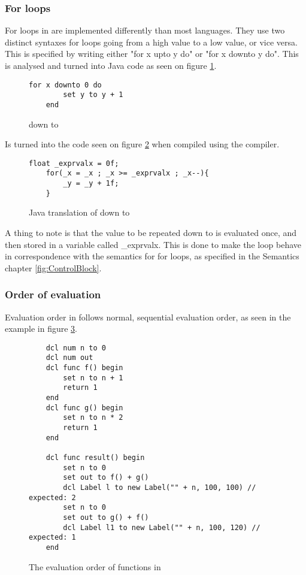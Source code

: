\subsubsection{For loops}
For loops in \lang{} are implemented differently than most languages. They use two distinct syntaxes for loops going from a high value to a low value, or vice versa. This is specified by writing either "for x upto y do" or "for x downto y do". This is analysed and turned into Java code as seen on figure \ref{fig:downtobfgl}.

\begin{figure}[H]
\centering
    \begin{lstlisting}[style=gglang]
    for x downto 0 do
        set y to y + 1
    end
    \end{lstlisting}
    \caption{\lang{} down to}\label{fig:downtobfgl}
\end{figure}
Is turned into the code seen on figure \ref{fig:downtojava} when compiled using the \lang{} compiler.
\begin{figure}[H]
\centering
    \begin{lstlisting}[style=gglang]
    float _exprvalx = 0f;
    for(_x = _x ; _x >= _exprvalx ; _x--){
        _y = _y + 1f;
    }
    \end{lstlisting}
    \caption{Java translation of down to}\label{fig:downtojava}
\end{figure}

A thing to note is that the value to be repeated down to is evaluated once, and then stored in a variable called \_exprvalx. This is done to make the loop behave in correspondence with the semantics for for loops, as specified in the Semantics chapter \ref{fig:ControlBlock}.

\subsubsection*{Order of evaluation}
Evaluation order in \lang{} follows normal, sequential evaluation order, as seen in the example in figure \ref{fig:ecaluationorder}.

\begin{figure}[H]
    \centering
    \begin{lstlisting}
    dcl num n to 0
    dcl num out
    dcl func f() begin
        set n to n + 1
        return 1
    end
    dcl func g() begin
        set n to n * 2
        return 1
    end

    dcl func result() begin
        set n to 0
        set out to f() + g()
        dcl Label l to new Label("" + n, 100, 100) // expected: 2
        set n to 0
        set out to g() + f()
        dcl Label l1 to new Label("" + n, 100, 120) // expected: 1
    end
    \end{lstlisting}
    \caption{The evaluation order of functions in \lang{}}\label{fig:ecaluationorder}
\end{figure}

